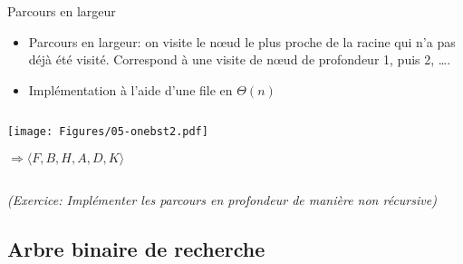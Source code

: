 \begin{frame}{Parcours en largeur}

\begin{itemize}
\item Parcours en largeur: on visite le n\oe ud le plus proche de la racine qui n'a pas déjà été visité. Correspond à une visite de n\oe ud de profondeur 1, puis 2, \ldots.
\item Implémentation à l'aide d'une file en $\Theta(n)$
\end{itemize}


\begin{columns}
\begin{column}{5cm}
\begin{center}
\texttt{[image: Figures/05-onebst2.pdf]}
\bigskip

$\Rightarrow \langle F,B,H,A,D,K\rangle$
\end{center}
\end{column}~~~~~~~
\begin{column}{5cm}
\begin{center}
\begin{footnotesize}
\end{footnotesize}
\end{center}
\end{column}
\end{columns}

\medskip

\emph{(Exercice: Implémenter les parcours en profondeur de manière non récursive)}
\end{frame}

\subsection{Arbre binaire de recherche}

